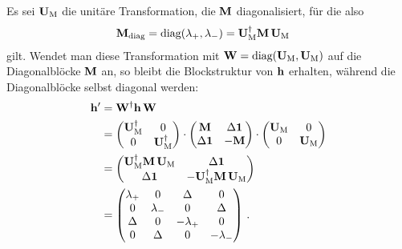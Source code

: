 Es sei $\mathbf{U}_\text{M}$ die unitäre Transformation, die $\mathbf{M}$ diagonalisiert, für die also
\begin{align}
    \mathbf{M}_{\text{diag}} &= \text{diag}(\lambda_+, \lambda_-) = \mathbf{U}_\text{M}^\dagger  \mathbf{M} \, \mathbf{U}_\text{M}
\end{align}
gilt. 
Wendet man diese Transformation mit $\mathbf{W} = \text{diag}(\mathbf{U}_\text{M}, \mathbf{U}_\text{M})$ auf die Diagonalblöcke $\mathbf{M}$ an, so bleibt die Blockstruktur von $\mathbf{h}$ erhalten, während die Diagonalblöcke selbst diagonal werden:
\begin{align}
    \mathbf{h}' &= \mathbf{W}^\dagger \mathbf{h} \, \mathbf{W} \\
    &= \begin{pmatrix}
        \mathbf{U}_\text{M}^\dagger & 0 \\ 0 & \mathbf{U}_\text{M}^\dagger
    \end{pmatrix} \cdot \begin{pmatrix}
        \mathbf{M} & \Delta \mathbf{1} \\ \Delta \mathbf{1} & -\mathbf{M}
    \end{pmatrix} \cdot \begin{pmatrix}
        \mathbf{U}_\text{M} & 0 \\ 0 & \mathbf{U}_\text{M}
    \end{pmatrix} \\
    &= \begin{pmatrix}
        \mathbf{U}_\text{M}^\dagger \mathbf{M} \, \mathbf{U}_\text{M} & \Delta \mathbf{1} \\ \Delta \mathbf{1} &-\mathbf{U}_\text{M}^\dagger \mathbf{M} \, \mathbf{U}_\text{M} 
    \end{pmatrix} \\
    &= \begin{pmatrix}
        \lambda_+ & 0 & \Delta & 0 \\
        0 & \lambda_- & 0 & \Delta \\
        \Delta & 0 & -\lambda_+ & 0 \\
        0 & \Delta & 0 & -\lambda_-
    \end{pmatrix} \, .
\end{align}

